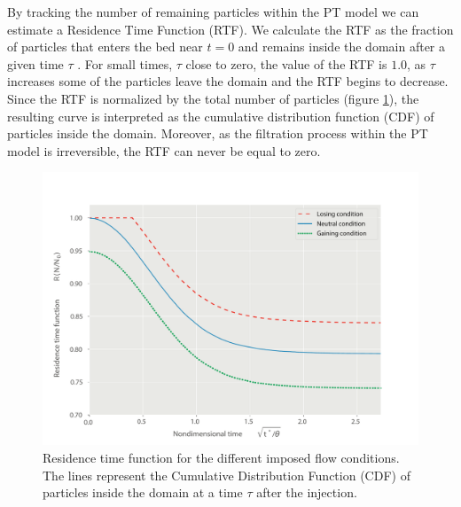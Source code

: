 \documentclass[draft,linenumbers]{agujournal2018}
\begin{document}
By tracking the number of remaining particles within the PT model we can estimate a Residence Time Function (RTF). We calculate the RTF as the fraction of particles that enters the bed near $t = 0$ and remains inside the domain after a given time $\tau$ \citep{Elliott1997,Packman2000}. For small times, $\tau$ close to zero, the value of the RTF is $1.0$, as $\tau$ increases some of the particles leave the domain and the RTF begins to decrease. Since the RTF is normalized by the total number of particles (figure \ref{RTF}), the resulting curve is interpreted as the cumulative distribution function (CDF) of particles inside the domain. Moreover, as the filtration process within the PT model is irreversible, the RTF can never be equal to zero.

\begin{figure}[ht]
\centering
\includegraphics[trim=0.2cm 0.2cm 0.2cm 0.2cm, width=35pc]
{190305_RTF.pdf}
\caption{Residence time function for the different imposed flow conditions. The lines represent the Cumulative Distribution Function (CDF) of particles inside the domain at a time $\tau$ after the injection.}
\label{RTF}
\end{figure}
\end{document}
